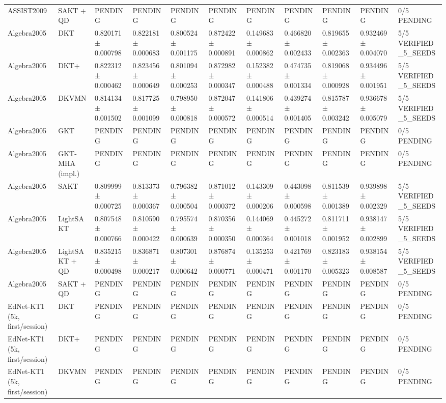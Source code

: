 \begin{longtable}{lllllllllll}
ASSIST2009 & SAKT + QD & PENDING & PENDING & PENDING & PENDING & PENDING & PENDING & PENDING & PENDING & 0/5 PENDING \\
Algebra2005 & DKT & 0.820171 ± 0.000798 & 0.822181 ± 0.000683 & 0.800524 ± 0.001175 & 0.872422 ± 0.000891 & 0.149683 ± 0.000862 & 0.466820 ± 0.002433 & 0.819655 ± 0.002363 & 0.932469 ± 0.004070 & 5/5 VERIFIED\_5\_SEEDS \\
Algebra2005 & DKT+ & 0.822312 ± 0.000462 & 0.823456 ± 0.000649 & 0.801094 ± 0.000253 & 0.872982 ± 0.000347 & 0.152382 ± 0.000488 & 0.474735 ± 0.001334 & 0.819068 ± 0.000928 & 0.934496 ± 0.001951 & 5/5 VERIFIED\_5\_SEEDS \\
Algebra2005 & DKVMN & 0.814134 ± 0.001502 & 0.817725 ± 0.001099 & 0.798950 ± 0.000818 & 0.872047 ± 0.000572 & 0.141806 ± 0.000514 & 0.439274 ± 0.001405 & 0.815787 ± 0.003242 & 0.936678 ± 0.005079 & 5/5 VERIFIED\_5\_SEEDS \\
Algebra2005 & GKT & PENDING & PENDING & PENDING & PENDING & PENDING & PENDING & PENDING & PENDING & 0/5 PENDING \\
Algebra2005 & GKT-MHA (impl.) & PENDING & PENDING & PENDING & PENDING & PENDING & PENDING & PENDING & PENDING & 0/5 PENDING \\
Algebra2005 & SAKT & 0.809999 ± 0.000725 & 0.813373 ± 0.000367 & 0.796382 ± 0.000504 & 0.871012 ± 0.000372 & 0.143309 ± 0.000206 & 0.443098 ± 0.000598 & 0.811539 ± 0.001389 & 0.939898 ± 0.002329 & 5/5 VERIFIED\_5\_SEEDS \\
Algebra2005 & LightSAKT & 0.807548 ± 0.000766 & 0.810590 ± 0.000422 & 0.795574 ± 0.000639 & 0.870356 ± 0.000350 & 0.144069 ± 0.000364 & 0.445272 ± 0.001018 & 0.811711 ± 0.001952 & 0.938147 ± 0.002899 & 5/5 VERIFIED\_5\_SEEDS \\
Algebra2005 & LightSAKT + QD & 0.835215 ± 0.000498 & 0.836871 ± 0.000217 & 0.807301 ± 0.000642 & 0.876874 ± 0.000771 & 0.135253 ± 0.000471 & 0.421769 ± 0.001170 & 0.823183 ± 0.005323 & 0.938154 ± 0.008587 & 5/5 VERIFIED\_5\_SEEDS \\
Algebra2005 & SAKT + QD & PENDING & PENDING & PENDING & PENDING & PENDING & PENDING & PENDING & PENDING & 0/5 PENDING \\
EdNet-KT1 (5k, first/session) & DKT & PENDING & PENDING & PENDING & PENDING & PENDING & PENDING & PENDING & PENDING & 0/5 PENDING \\
EdNet-KT1 (5k, first/session) & DKT+ & PENDING & PENDING & PENDING & PENDING & PENDING & PENDING & PENDING & PENDING & 0/5 PENDING \\
EdNet-KT1 (5k, first/session) & DKVMN & PENDING & PENDING & PENDING & PENDING & PENDING & PENDING & PENDING & PENDING & 0/5 PENDING \\

\end{longtable}
